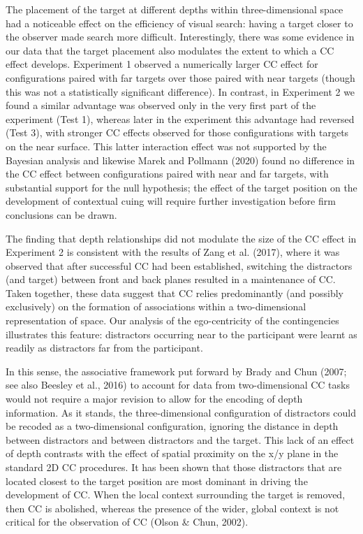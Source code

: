\documentclass[
  english,
  man,floatsintext]{apa7}
\begin{document}
The placement of the target at different depths within three-dimensional space had a noticeable effect on the efficiency of visual search: having a target closer to the observer made search more difficult. Interestingly, there was some evidence in our data that the target placement also modulates the extent to which a CC effect develops. Experiment 1 observed a numerically larger CC effect for configurations paired with far targets over those paired with near targets (though this was not a statistically significant difference). In contrast, in Experiment 2 we found a similar advantage was observed only in the very first part of the experiment (Test 1), whereas later in the experiment this advantage had reversed (Test 3), with stronger CC effects observed for those configurations with targets on the near surface. This latter interaction effect was not supported by the Bayesian analysis and likewise Marek and Pollmann (2020) found no difference in the CC effect between configurations paired with near and far targets, with substantial support for the null hypothesis; the effect of the target position on the development of contextual cuing will require further investigation before firm conclusions can be drawn.

The finding that depth relationships did not modulate the size of the CC effect in Experiment 2 is consistent with the results of Zang et al. (2017), where it was observed that after successful CC had been established, switching the distractors (and target) between front and back planes resulted in a maintenance of CC. Taken together, these data suggest that CC relies predominantly (and possibly exclusively) on the formation of associations within a two-dimensional representation of space. Our analysis of the ego-centricity of the contingencies illustrates this feature: distractors occurring near to the participant were learnt as readily as distractors far from the participant.

In this sense, the associative framework put forward by Brady and Chun (2007; see also Beesley et al., 2016) to account for data from two-dimensional CC tasks would not require a major revision to allow for the encoding of depth information. As it stands, the three-dimensional configuration of distractors could be recoded as a two-dimensional configuration, ignoring the distance in depth between distractors and between distractors and the target. This lack of an effect of depth contrasts with the effect of spatial proximity on the x/y plane in the standard 2D CC procedures. It has been shown that those distractors that are located closest to the target position are most dominant in driving the development of CC. When the local context surrounding the target is removed, then CC is abolished, whereas the presence of the wider, global context is not critical for the observation of CC (Olson \& Chun, 2002).
\end{document}
